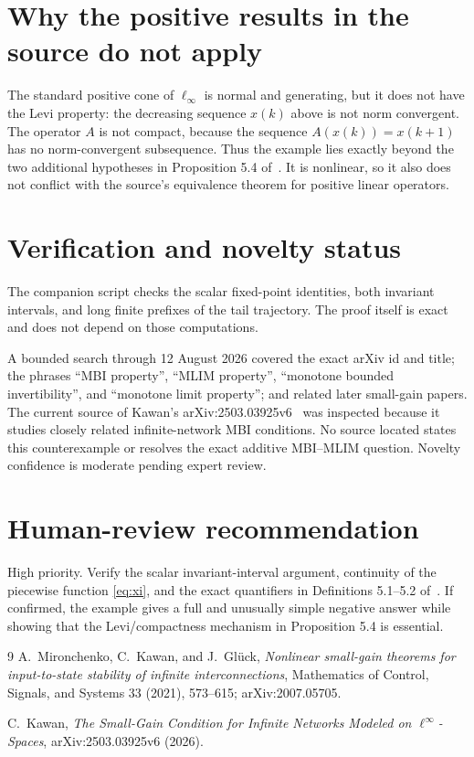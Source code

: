 \documentclass[11pt,a4paper]{article}
\begin{document}
\section{Why the positive results in the source do not apply}

The standard positive cone of $\ell_\infty$ is normal and generating, but it
does not have the Levi property: the decreasing sequence $x(k)$ above is not
norm convergent.  The operator $A$ is not compact, because the sequence
$A(x(k))=x(k+1)$ has no norm-convergent subsequence.  Thus the example lies
exactly beyond the two additional hypotheses in Proposition 5.4 of~\cite{MKG}.
It is nonlinear, so it also does not conflict with the source's equivalence
theorem for positive linear operators.

\section{Verification and novelty status}

The companion script checks the scalar fixed-point identities, both invariant
intervals, and long finite prefixes of the tail trajectory.  The proof itself
is exact and does not depend on those computations.

A bounded search through 12 August 2026 covered the exact arXiv id and title;
the phrases ``MBI property'', ``MLIM property'', ``monotone bounded
invertibility'', and ``monotone limit property''; and related later
small-gain papers.  The current source of Kawan's arXiv:2503.03925v6~\cite{Kaw}
was inspected because it studies closely related infinite-network MBI
conditions.  No source located states this counterexample or resolves the
exact additive MBI--MLIM question.  Novelty confidence is moderate pending
expert review.

\section{Human-review recommendation}

High priority.  Verify the scalar invariant-interval argument, continuity of
the piecewise function \eqref{eq:xi}, and the exact quantifiers in Definitions
5.1--5.2 of~\cite{MKG}.  If confirmed, the example gives a full and unusually
simple negative answer while showing that the Levi/compactness mechanism in
Proposition 5.4 is essential.

\begin{thebibliography}{9}
A.~Mironchenko, C.~Kawan, and J.~Gl\"uck,
\emph{Nonlinear small-gain theorems for input-to-state stability of infinite
interconnections}, Mathematics of Control, Signals, and Systems 33 (2021),
573--615; arXiv:2007.05705.

C.~Kawan,
\emph{The Small-Gain Condition for Infinite Networks Modeled on
$\ell^\infty$-Spaces}, arXiv:2503.03925v6 (2026).
\end{thebibliography}
\end{document}
